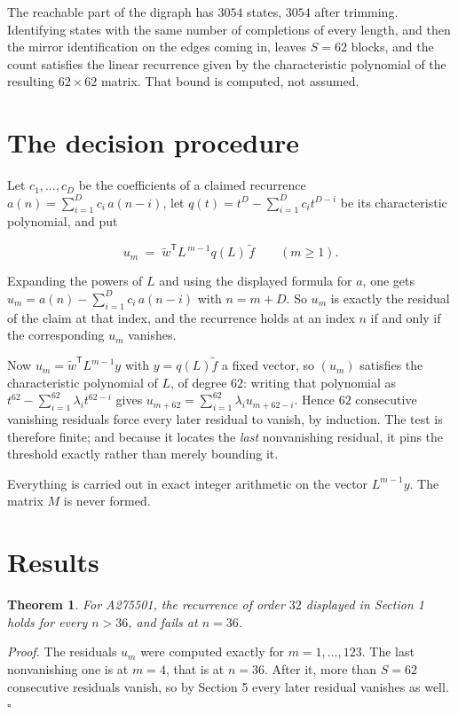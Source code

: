 \documentclass[11pt]{article}
\newtheorem{theorem}{Theorem}
\theoremstyle{definition}
\begin{document}
The reachable part of the digraph has $3054$ states, $3054$ after trimming. Identifying states with the same number of completions of every length, and then the mirror identification on the edges coming in, leaves $S = 62$ blocks, and the count satisfies the linear recurrence given by the characteristic polynomial of the resulting $62\times62$ matrix. That bound is computed, not assumed.

\section{The decision procedure}

Let $c_1,\dots,c_D$ be the coefficients of a claimed recurrence $a(n) = \sum_{i=1}^{D} c_i\,a(n-i)$, let $q(t) = t^{D} - \sum_{i=1}^{D} c_i t^{D-i}$ be its characteristic polynomial, and put

\[u_m \;=\; \tilde w^{\mathsf T} L^{\,m-1} q(L)\,\tilde f \qquad (m \ge 1).\]

Expanding the powers of $L$ and using the displayed formula for $a$, one gets $u_m = a(n) - \sum_{i=1}^{D} c_i\,a(n-i)$ with $n = m + D$. So $u_m$ is exactly the residual of the claim at that index, and the recurrence holds at an index $n$ if and only if the corresponding $u_m$ vanishes.

Now $u_m = \tilde w^{\mathsf T} L^{m-1} y$ with $y = q(L)\tilde f$ a fixed vector, so $(u_m)$ satisfies the characteristic polynomial of $L$, of degree $62$: writing that polynomial as $t^{62} - \sum_{i=1}^{62} \lambda_i t^{62-i}$ gives $u_{m+62} = \sum_{i=1}^{62} \lambda_i u_{m+62-i}$. Hence $62$ consecutive vanishing residuals force every later residual to vanish, by induction. The test is therefore finite; and because it locates the {\itshape last} nonvanishing residual, it pins the threshold exactly rather than merely bounding it.

Everything is carried out in exact integer arithmetic on the vector $L^{m-1}y$. The matrix $M$ is never formed.

\section{Results}

\begin{theorem} For A275501, the recurrence of order $32$ displayed in Section 1 holds for every $n > 36$, and fails at $n = 36$.\end{theorem}

{\itshape Proof.} The residuals $u_m$ were computed exactly for $m = 1,\dots,123$. The last nonvanishing one is at $m = 4$, that is at $n = 36$. After it, more than $S = 62$ consecutive residuals vanish, so by Section 5 every later residual vanishes as well. $\square$
\end{document}
